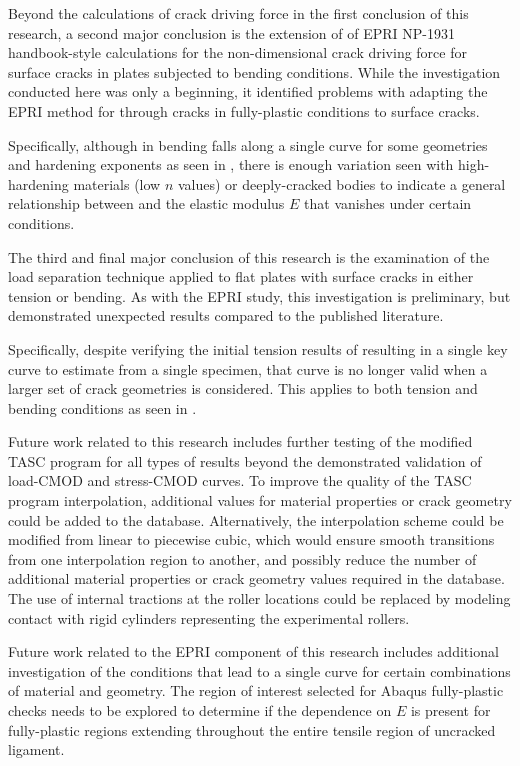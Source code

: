 Beyond the calculations of crack driving force in the first conclusion of this research, a second major conclusion is the extension of of EPRI NP-1931 handbook-style calculations for the non-dimensional crack driving force \hone for surface cracks in plates subjected to bending conditions.
While the investigation conducted here was only a beginning, it identified problems with adapting the EPRI method for through cracks in fully-plastic conditions to surface cracks.

Specifically, although
\hone in bending falls along a single curve for some geometries and hardening exponents as seen in , there is enough variation seen with high-hardening materials (low \(n\) values) or deeply-cracked bodies to indicate a general relationship between \hone and the elastic modulus \(E\) that vanishes under certain conditions.

The third and final major conclusion of this research is the examination of the load separation technique applied to flat plates with surface cracks in either tension or bending.
As with the EPRI \hone study, this investigation is preliminary, but demonstrated unexpected results compared to the published literature.

Specifically, despite verifying the initial tension results of \citet{sharobeamlandes1994} resulting in a single key curve to estimate \J from a single specimen, that curve is no longer valid when a larger set of crack geometries is considered.
This applies to both tension and bending conditions as seen in .

Future work related to this research includes further testing of the modified TASC program for all types of results beyond the demonstrated validation of load-CMOD and stress-CMOD curves.
To improve the quality of the TASC program interpolation, additional values for material properties or crack geometry could be added to the database.
Alternatively, the interpolation scheme could be modified from linear to piecewise cubic, which would ensure smooth transitions from one interpolation region to another, and possibly reduce the number of additional material properties or crack geometry values required in the database.
The use of internal tractions at the roller locations could be replaced by modeling contact with rigid cylinders representing the experimental rollers.

Future work related to the EPRI \hone component of this research includes additional investigation of the conditions that lead to a single \hone curve for certain combinations of material and geometry.
The region of interest selected for Abaqus fully-plastic checks needs to be explored to determine if the \hone dependence on \(E\) is present for fully-plastic regions extending throughout the entire tensile region of uncracked ligament.


